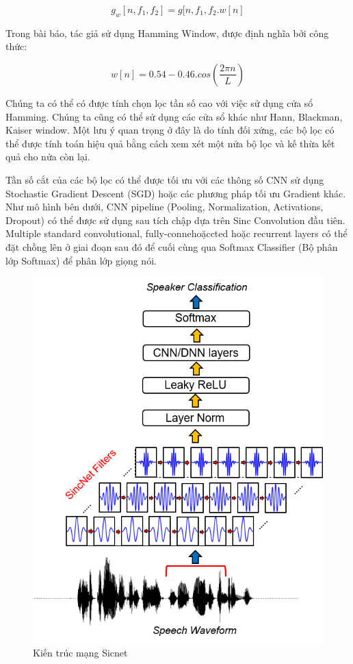 \documentclass{article}
\begin{document}
	$$g_{w}\left[n, f_1, f_2\right] = g[n, f_1, f_2 . w[n]$$
	
	Trong bài báo, tác giả sử dụng Hamming Window, được định nghĩa bởi công thức:
	
	$$w[n] = 0.54 - 0.46.cos(\frac{2\pi n}{L})$$
	
	
	Chúng ta có thể có được tính chọn lọc tần số cao với việc sử dụng cửa sổ Hamming. Chúng ta cũng có thể sử dụng các cửa sổ khác như Hann, Blackman, Kaiser window. Một lưu ý quan trọng ở đây là do tính đối xứng, các bộ lọc có thể được tính toán hiệu quả bằng cách xem xét một nửa bộ lọc và kế thừa kết quả cho nửa còn lại.
	
	Tần số cắt của các bộ lọc có thể được tối ưu với các thông số CNN sử dụng Stochastic Gradient Descent (SGD) hoặc các phương pháp tối ưu Gradient khác. Như mô hình bên dưới, CNN pipeline (Pooling, Normalization, Activations, Dropout) có thể được sử dụng sau tích chập dựa trên Sinc Convolution đầu tiên. Multiple standard convolutional, fully-connehoặccted hoặc recurrent layers có thể đặt chồng lên ở giai đoạn sau đó để cuối cùng qua Softmax Classifier (Bộ phân lớp Softmax) để phân lớp giọng nói.
	
	\begin{figure}[H]
		\centering
		\includegraphics[width=.9\textwidth]{charts/SincNet.png}
		\caption{Kiến trúc mạng Sicnet}
		\label{fig:writing-thesis}
	\end{figure}
\end{document}
